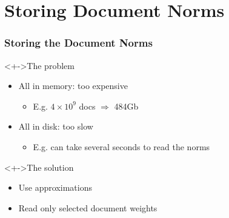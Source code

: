 \documentclass[svgnames]{beamer}
\begin{document}

\section{Storing Document Norms}

\begin{frame}
  \frametitle{Storing the Document Norms}
  
  \begin{block}<+->{The problem}
    \begin{itemize}
    \item All in memory: too expensive
      \begin{itemize}
      \item E.g. $4 \times 10^{9}$ docs $\Rightarrow$ 484Gb
      \end{itemize}
    \item All in disk: too slow
      \begin{itemize}
      \item E.g. can take several seconds to read the norms
      \end{itemize}
    \end{itemize}
  \end{block}

  \begin{block}<+->{The solution}
    \begin{itemize}
    \item Use approximations
    \item Read only selected document weights
    \end{itemize}
  \end{block}

\end{frame}

\end{document}

